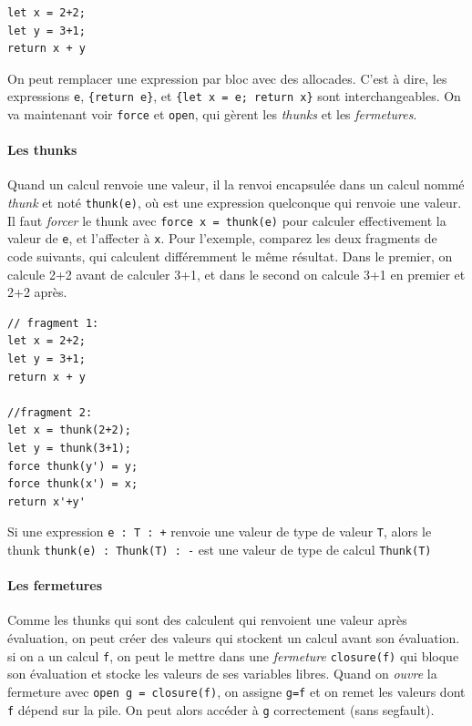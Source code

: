 \documentclass[12pt]{article}
\begin{document}
\begin{verbatim}
let x = 2+2;
let y = 3+1;
return x + y
\end{verbatim}

On peut remplacer une expression par bloc avec des allocades. C'est à
dire, les expressions \texttt{e}, \texttt{\{return\ e\}}, et
\texttt{\{let\ x\ =\ e;\ return\ x\}} sont interchangeables. On va
maintenant voir \texttt{force} et \texttt{open}, qui gèrent les
\emph{thunks} et les \emph{fermetures}.

\hypertarget{les-thunks}{%
      \paragraph*{Les thunks}\label{les-thunks}}

Quand un calcul renvoie une valeur, il la renvoi encapsulée dans un
calcul nommé \emph{thunk} et noté \texttt{thunk(e)}, où est une
expression quelconque qui renvoie une valeur. Il faut \emph{forcer} le
thunk avec \texttt{force\ x\ =\ thunk(e)} pour calculer effectivement la
valeur de \texttt{e}, et l'affecter à \texttt{x}. Pour l'exemple,
comparez les deux fragments de code suivants, qui calculent différemment
le même résultat. Dans le premier, on calcule 2+2 avant de calculer 3+1,
et dans le second on calcule 3+1 en premier et 2+2 après.

\begin{verbatim}
// fragment 1:
let x = 2+2;
let y = 3+1;
return x + y 
  
//fragment 2:
let x = thunk(2+2);
let y = thunk(3+1);
force thunk(y') = y;
force thunk(x') = x;
return x'+y'
\end{verbatim}

Si une expression \texttt{e\ :\ T\ :\ +} renvoie une valeur de type de
valeur \texttt{T}, alors le thunk \texttt{thunk(e)\ :\ Thunk(T)\ :\ -}
est une valeur de type de calcul \texttt{Thunk(T)}

\hypertarget{les-fermetures}{%
      \paragraph*{Les fermetures}\label{les-fermetures}}

Comme les thunks qui sont des calculent qui renvoient une valeur après
évaluation, on peut créer des valeurs qui stockent un calcul avant son
évaluation. si on a un calcul \texttt{f}, on peut le mettre dans une
\emph{fermeture} \texttt{closure(f)} qui bloque son évaluation et stocke
les valeurs de ses variables libres. Quand on \emph{ouvre} la fermeture
avec \texttt{open\ g\ =\ closure(f)}, on assigne \texttt{g=f} et on
remet les valeurs dont \texttt{f} dépend sur la pile. On peut alors
accéder à \texttt{g} correctement (sans segfault).
\end{document}
